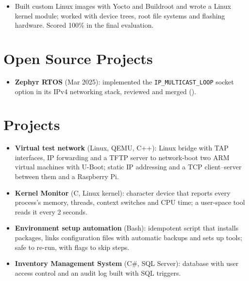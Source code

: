 \documentclass[10pt]{article}
\begin{document}
\begin{itemize}
  \item Built custom Linux images with Yocto and Buildroot and wrote a Linux kernel module; worked with device trees, root file systems and flashing hardware. Scored 100\% in the final evaluation.
\end{itemize}

\section*{Open Source Projects}
\begin{itemize}
  \item \textbf{Zephyr RTOS} (Mar 2025): implemented the \texttt{IP\_MULTICAST\_LOOP} socket option in its IPv4 networking stack, reviewed and merged ().
\end{itemize}

\section*{Projects}
\begin{itemize}
  \item \textbf{Virtual test network} (Linux, QEMU, C++): Linux bridge with TAP interfaces, IP forwarding and a TFTP server to network-boot two ARM virtual machines with U-Boot; static IP addressing and a TCP client--server between them and a Raspberry Pi. 
  \item \textbf{Kernel Monitor} (C, Linux kernel): character device that reports every process's memory, threads, context switches and CPU time; a user-space tool reads it every 2 seconds. 
  \item \textbf{Environment setup automation} (Bash): idempotent script that installs packages, links configuration files with automatic backups and sets up tools; safe to re-run, with flags to skip steps. 
  \item \textbf{Inventory Management System} (C\#, SQL Server): database with user access control and an audit log built with SQL triggers. 
\end{itemize}
\end{document}
